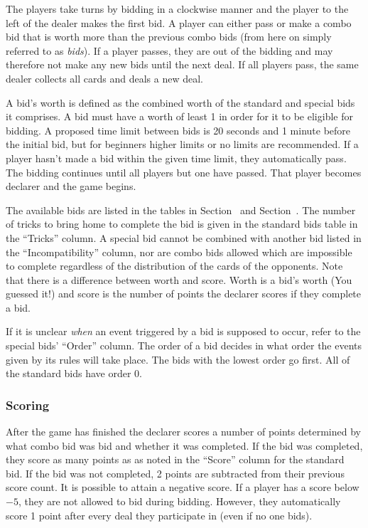 \documentclass[a4paper]{article}
\begin{document}
				The players take turns by bidding in a clockwise manner and the player to the left of the dealer makes the first bid. A player can either pass or make a combo bid that is worth more than the previous combo bids (from here on simply referred to as \emph{bids}). If a player passes, they are out of the bidding and may therefore not make any new bids until the next deal. If all players pass, the same dealer collects all cards and deals a new deal.

				A bid's worth is defined as the combined worth of the standard and special bids it comprises. A bid must have a worth of least 1 in order for it to be eligible for bidding. A proposed time limit between bids is 20 seconds and 1 minute before the initial bid, but for beginners higher limits or no limits are recommended. If a player hasn't made a bid within the given time limit, they automatically pass. The bidding continues until all players but one have passed. That player becomes declarer and the game begins.

				The available bids are listed in the tables in Section~ and Section~. The number of tricks to bring home to complete the bid is given in the standard bids table in the ``Tricks'' column. A special bid cannot be combined with another bid listed in the ``Incompatibility'' column, nor are combo bids allowed which are impossible to complete regardless of the distribution of the cards of the opponents. Note that there is a difference between worth and score. Worth is a bid's worth (You guessed it!) and score is the number of points the declarer scores if they complete a bid.

				If it is unclear \emph{when} an event triggered by a bid is supposed to occur, refer to the special bids' ``Order'' column. The order of a bid decides in what order the events given by its rules will take place. The bids with the lowest order go first. All of the standard bids have order 0.

			\subsubsection{Scoring}
				After the game has finished the declarer scores a number of points determined by what combo bid was bid and whether it was completed. If the bid was completed, they score as many points as as noted in the ``Score'' column for the standard bid. If the bid was not completed, 2 points are subtracted from their previous score count. It is possible to attain a negative score. If a player has a score below $-5$, they are not allowed to bid during bidding. However, they automatically score 1 point after every deal they participate in (even if no one bids).
\end{document}
